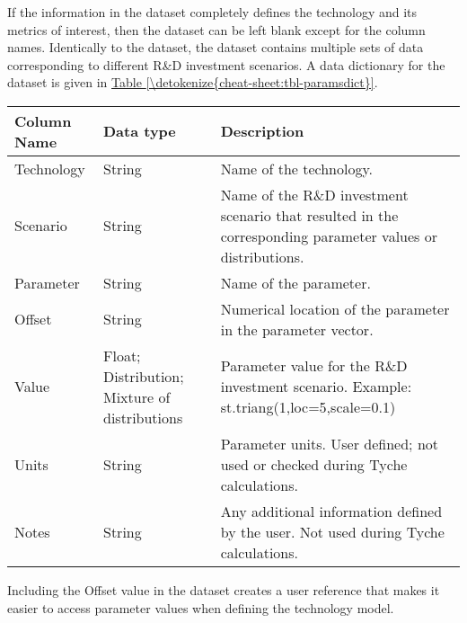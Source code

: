 \documentclass[letterpaper,10pt,english]{sphinxmanual}
\begin{document}
If the information in the  dataset completely defines the technology and its metrics of interest, then the  dataset can be left blank except for the column names. Identically to the  dataset, the  dataset contains multiple sets of data corresponding to different R\&D investment scenarios. A data dictionary for the  dataset is given in \hyperref[\detokenize{cheat-sheet:tbl-paramsdict}]{Table \ref{\detokenize{cheat-sheet:tbl-paramsdict}}}.


\begin{savenotes}\sphinxattablestart
\centering
{}
\sphinxthecaptionisattop
{}\label{\detokenize{cheat-sheet:table-3}}\label{\detokenize{cheat-sheet:tbl-paramsdict}}
\sphinxaftertopcaption
\begin{tabulary}{\linewidth}[t]{|T|T|T|}
\hline
\sphinxstyletheadfamily 
Column Name
&\sphinxstyletheadfamily 
Data type
&\sphinxstyletheadfamily 
Description
\\
\hline
Technology
&
String
&
Name of the technology.
\\
\hline
Scenario
&
String
&
Name of the R\&D investment scenario that resulted in the corresponding parameter values or distributions.
\\
\hline
Parameter
&
String
&
Name of the parameter.
\\
\hline
Offset
&
String
&
Numerical location of the parameter in the parameter vector.
\\
\hline
Value
&
Float; Distribution; Mixture of distributions
&
Parameter value for the R\&D investment scenario. Example: st.triang(1,loc=5,scale=0.1)
\\
\hline
Units
&
String
&
Parameter units. User defined; not used or checked during Tyche calculations.
\\
\hline
Notes
&
String
&
Any additional information defined by the user. Not used during Tyche calculations.
\\
\hline
\end{tabulary}
\par
\sphinxattableend\end{savenotes}

Including the Offset value in the  dataset creates a user reference that makes it easier to access parameter values when defining the technology model.
\end{document}
